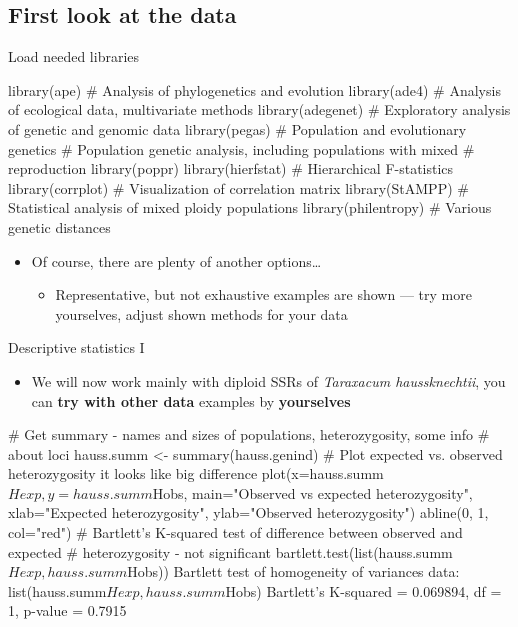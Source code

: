 \documentclass[compress, xelatex, 11pt, xcolor=svgnames, aspectratio=169,
	hyperref={
		bookmarks=true,
		unicode=true,
		colorlinks=true,
		pdftitle={Molecular data in R},
		plainpages=false,
		pdfauthor={Vojtech Zeisek},
		pdfsubject={Course about phylogeny and evolution in R},
		pdfcreator={XeLaTeX},
		pdfkeywords={R, evolution, phylogeny, molecular data},
		linkcolor=Crimson, %
		anchorcolor=Magenta, %
		citecolor=Magenta, %
		filecolor=Magenta, %
		menucolor=Magenta, %
		urlcolor=DodgerBlue, %
		},
	url={hyphens, lowtilde} %
	]{beamer}
\begin{document}
\subsection{First look at the data}

\begin{frame}[fragile]{Load needed libraries}
	\begin{spluscode}
    library(ape) # Analysis of phylogenetics and evolution
    library(ade4) # Analysis of ecological data, multivariate methods
    library(adegenet) # Exploratory analysis of genetic and genomic data
    library(pegas) # Population and evolutionary genetics
    # Population genetic analysis, including populations with mixed
    # reproduction
    library(poppr)
    library(hierfstat) # Hierarchical F-statistics
    library(corrplot) # Visualization of correlation matrix
    library(StAMPP) # Statistical analysis of mixed ploidy populations
    library(philentropy) # Various genetic distances
	\end{spluscode}
	\begin{itemize}
		\item Of course, there are plenty of another options\ldots
		\begin{itemize}
			\item Representative, but not exhaustive examples are shown --- \alert{try more yourselves, adjust shown methods for your data}
		\end{itemize}
	\end{itemize}
\end{frame}

\begin{frame}[fragile]{Descriptive statistics I}
	\label{popgenindx}
	\begin{itemize}
		\item We will now work mainly with diploid SSRs of \textit{Taraxacum haussknechtii}, you can \textbf{try with other data} examples by \textbf{yourselves}
	\end{itemize}
	\begin{spluscode}
    # Get summary - names and sizes of populations, heterozygosity, some info
    # about loci
    hauss.summ <- summary(hauss.genind)
    # Plot expected vs. observed heterozygosity it looks like big difference
    plot(x=hauss.summ$Hexp, y=hauss.summ$Hobs,
      main="Observed vs expected heterozygosity",
      xlab="Expected heterozygosity", ylab="Observed heterozygosity")
    abline(0, 1, col="red")
    # Bartlett's K-squared test of difference between observed and expected
    # heterozygosity - not significant
    bartlett.test(list(hauss.summ$Hexp, hauss.summ$Hobs))
                  Bartlett test of homogeneity of variances
    data:  list(hauss.summ$Hexp, hauss.summ$Hobs)
    Bartlett's K-squared = 0.069894, df = 1, p-value = 0.7915
	\end{spluscode}
\end{frame}
\end{document}

